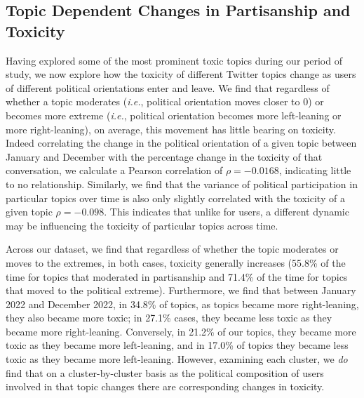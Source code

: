 \subsection{Topic Dependent Changes in Partisanship and Toxicity \label{sec:changes}} Having explored some of the most prominent toxic topics during our period of study, we now explore how the toxicity of different Twitter topics change as users of different political orientations enter and leave. We find that regardless of whether a topic moderates (\textit{i.e.}, political orientation moves closer to 0) or becomes more extreme (\textit{i.e.}, political orientation becomes more left-leaning or more right-leaning), on average, this movement has little bearing on toxicity. Indeed correlating the change in the political orientation of a given topic between January and December with the percentage change in the toxicity of that conversation, we calculate a Pearson correlation of $\rho=-0.0168$, indicating little to no relationship. Similarly, we find that the variance of political participation in particular topics over time is also only slightly correlated with the toxicity of a given topic $\rho=-0.098$. This indicates that unlike for users, a different dynamic may be influencing the toxicity of particular topics across time. 

Across our dataset, we find that regardless of whether the topic moderates or moves to the extremes, in both cases, toxicity generally increases (55.8\% of the time for topics that moderated in partisanship and 71.4\% of the time for topics that moved to the political extreme). Furthermore, we find that between January 2022 and December 2022, in 34.8\% of topics, as topics became more right-leaning, they also became more toxic; in 27.1\% cases, they became less toxic as they became more right-leaning. Conversely, in 21.2\% of our topics, they became more toxic as they became more left-leaning, and in  17.0\% of topics they became less toxic as they became more left-leaning. However, examining each cluster, we \emph{do} find that on a cluster-by-cluster basis as the political composition of users involved in that topic changes there are corresponding changes in toxicity.

